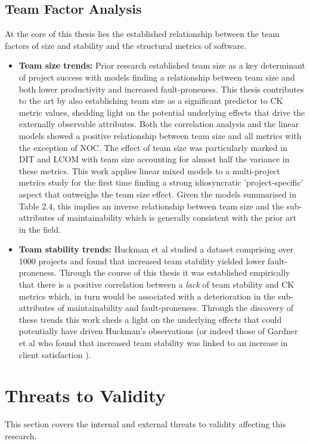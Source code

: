 \subsection{Team Factor Analysis}
At the core of this thesis lies the established relationship between the team factors of size and stability and the structural metrics of software.

\begin{itemize}
\item  \textbf{Team size trends: } Prior research established team size as a key determinant of project success with models finding a relationship between team size and both lower productivity and increased fault-proneness. This thesis contributes to the art by also establishing team size as a significant predictor to CK metric values, shedding light on the potential underlying effects that drive the externally observable attributes. Both the correlation analysis and the linear models showed a positive relationship between team size and all metrics with the exception of NOC. The effect of team size was particularly marked in DIT and LCOM with team size accounting for almost half the variance in these metrics. This work applies linear mixed models to a multi-project metrics study for the first time finding a strong idiosyncratic 'project-specific' aspect that outweighs the team size effect. Given the models summarised in Table 2.4, this implies an inverse relationship between team size and the sub-attributes of maintainability which is generally consistent with the prior art in the field. 

\item  \textbf{Team stability trends: } Huckman et al studied a dataset comprising over 1000 projects and found that increased team stability yielded lower fault-proneness. Through the course of this thesis it was established empirically that there is a positive correlation between a \textit{lack} of team stability and CK metrics which, in turn would be associated with a deterioration in the sub-attributes of maintainability and fault-proneness. Through the discovery of these trends this work sheds a light on the underlying effects that could potentially have driven Huckman's observations (or indeed those of Gardner et al who found that increased team stability was linked to an increase in client satisfaction \citep{gardner2012dynamically}).
\end{itemize}

\section{Threats to Validity} %
This section covers the internal and external threats to validity affecting this research.

